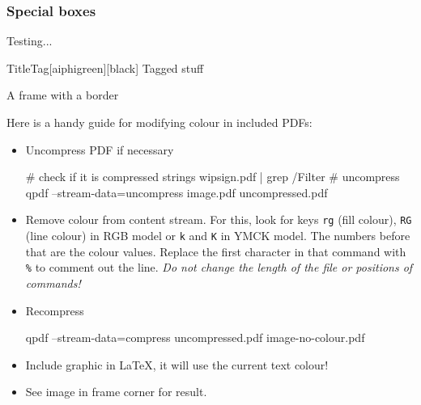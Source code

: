 \documentclass[mathserif, fleqn]{beamer}
\begin{document}
\begin{frame}\frametitle{Special boxes}
  \begin{fancybox}{Testing...}
    \lipsum[2]
  \end{fancybox}

  \begin{tagbox}{Title}{Tag}[aiphigreen][black]
    Tagged stuff
  \end{tagbox}
\end{frame}

\begin{frame}[border=aiphipetrol]
  \begin{center}\huge
    A frame with a border
  \end{center}
\end{frame}

\begin{frame}
  \scriptsize
  Here is a handy guide for modifying colour in included PDFs:
  \begin{itemize}
  \item Uncompress PDF if necessary
    \begin{shell}[]
# check if it is compressed
strings wipsign.pdf | grep /Filter
# uncompress
qpdf --stream-data=uncompress image.pdf uncompressed.pdf
    \end{shell}
  \item Remove colour from content stream. For this, look for keys \verb$rg$ (fill colour), \verb$RG$ (line colour) in RGB model or \verb$k$ and \verb$K$ in YMCK model. The numbers before that are the colour values.
    Replace the first character in that command with \verb$%$ to comment out the line. \emph{Do not change the length of the file or positions of commands!}
  \item Recompress
    \begin{shell}[]
qpdf --stream-data=compress uncompressed.pdf image-no-colour.pdf
    \end{shell}
  \item Include graphic in \LaTeX, it will use the current text colour!
  \item See image in frame corner for result.
  \end{itemize}
\end{frame}
\end{document}
